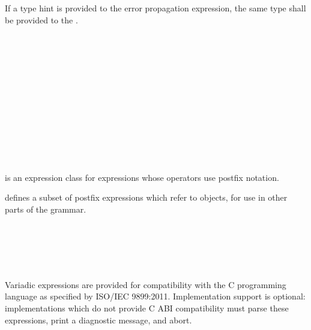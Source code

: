 \specsubsubitem
If a type hint is provided to the error propagation expression, the same type
shall be provided to the .


\begin{grammar}
 \\
	 \\
	 \\
	 \\
	 \\
	 \\
	 \\

 \\
	 \\
	 \\
	 \\
\end{grammar}

\specsubsubitem
{} is an expression class for expressions whose
operators use postfix notation.

\specsubsubitem
{} defines a subset of postfix expressions which
refer to objects, for use in other parts of the grammar.


\begin{grammar}
 \\
	 \terminal{(} \terminal{)} \\
	 \terminal{(}  \terminal{)} \\
	 \terminal{(}  \terminal{)} \\
\end{grammar}

\specsubsubitem
Variadic expressions are provided for compatibility with the C programming
language as specified by ISO/IEC 9899:2011. Implementation support is optional:
implementations which do not provide C ABI compatibility must parse these
expressions, print a diagnostic message, and abort.

